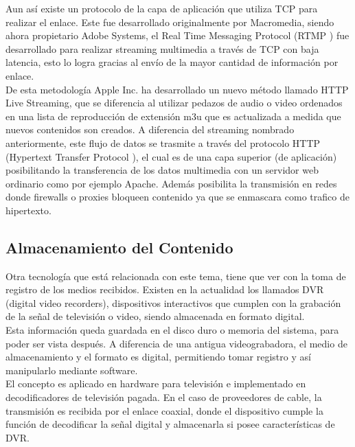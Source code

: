 Aun así existe un protocolo de la capa de aplicación que utiliza TCP para realizar el enlace. Este fue desarrollado originalmente por Macromedia, siendo ahora propietario Adobe Systems, el Real Time Messaging Protocol (RTMP \cite{bib:rtmp-specs}) fue desarrollado para realizar streaming multimedia a través de TCP con baja latencia, esto lo logra gracias al envío de la mayor cantidad de información por enlace. \\
	
	De esta metodología Apple Inc. ha desarrollado un nuevo método llamado HTTP Live Streaming, que se diferencia al utilizar pedazos de audio o video  ordenados en una lista de reproducción de extensión m3u que es actualizada a medida que nuevos contenidos son creados. A diferencia del streaming nombrado anteriormente, este flujo de datos se trasmite a través del protocolo HTTP (Hypertext Transfer Protocol \cite{sota:rfc-http}), el cual es de una capa superior (de aplicación) posibilitando la transferencia de los datos multimedia con un servidor web ordinario como por ejemplo Apache. Además posibilita la transmisión en redes donde firewalls o proxies bloqueen contenido ya que se enmascara como trafico de hipertexto.

\subsection{Almacenamiento del Contenido}

Otra tecnología que está relacionada con este tema, tiene que ver con la toma de registro de los medios recibidos. Existen en la actualidad los llamados DVR (digital video recorders), dispositivos interactivos que cumplen con la grabación de la señal de televisión o video, siendo almacenada en formato digital.\\

 Esta información queda guardada en el disco duro o memoria del sistema, para poder ser vista después. A diferencia de una antigua videograbadora, el medio de almacenamiento y el formato es digital, permitiendo tomar registro y así manipularlo mediante software.\\
 
	El concepto es aplicado en hardware para televisión e implementado en decodificadores de televisión pagada. En el caso de proveedores de cable, la transmisión es recibida por el enlace coaxial, donde el dispositivo cumple la función de decodificar la señal digital y almacenarla si posee características de DVR.

